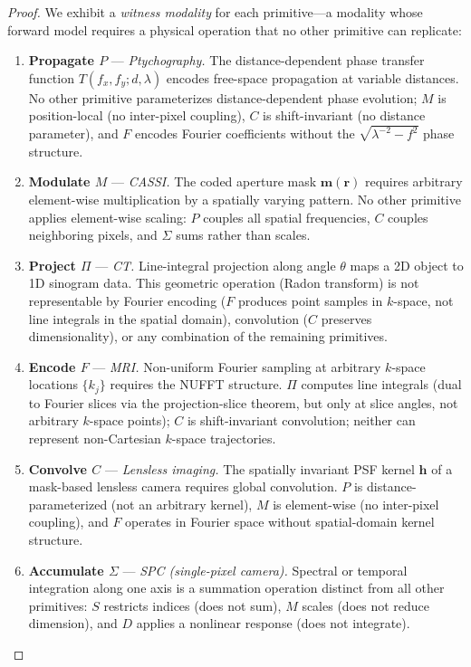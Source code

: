 \documentclass[11pt]{article}
\begin{document}
\begin{proof}
We exhibit a \emph{witness modality} for each primitive---a modality whose forward model requires a physical operation that no other primitive can replicate:
\begin{enumerate}
  \item \textbf{Propagate $P$} --- \emph{Ptychography.} The distance-dependent phase transfer function $T(f_x, f_y; d, \lambda)$ encodes free-space propagation at variable distances. No other primitive parameterizes distance-dependent phase evolution; $M$ is position-local (no inter-pixel coupling), $C$ is shift-invariant (no distance parameter), and $F$ encodes Fourier coefficients without the $\sqrt{\lambda^{-2} - f^2}$ phase structure.

  \item \textbf{Modulate $M$} --- \emph{CASSI.} The coded aperture mask $\mathbf{m}(\mathbf{r})$ requires arbitrary element-wise multiplication by a spatially varying pattern. No other primitive applies element-wise scaling: $P$ couples all spatial frequencies, $C$ couples neighboring pixels, and $\Sigma$ sums rather than scales.

  \item \textbf{Project $\Pi$} --- \emph{CT.} Line-integral projection along angle $\theta$ maps a 2D object to 1D sinogram data. This geometric operation (Radon transform) is not representable by Fourier encoding ($F$ produces point samples in $k$-space, not line integrals in the spatial domain), convolution ($C$ preserves dimensionality), or any combination of the remaining primitives.

  \item \textbf{Encode $F$} --- \emph{MRI.} Non-uniform Fourier sampling at arbitrary $k$-space locations $\{k_j\}$ requires the NUFFT structure. $\Pi$ computes line integrals (dual to Fourier slices via the projection-slice theorem, but only at slice angles, not arbitrary $k$-space points); $C$ is shift-invariant convolution; neither can represent non-Cartesian $k$-space trajectories.

  \item \textbf{Convolve $C$} --- \emph{Lensless imaging.} The spatially invariant PSF kernel $\mathbf{h}$ of a mask-based lensless camera requires global convolution. $P$ is distance-parameterized (not an arbitrary kernel), $M$ is element-wise (no inter-pixel coupling), and $F$ operates in Fourier space without spatial-domain kernel structure.

  \item \textbf{Accumulate $\Sigma$} --- \emph{SPC (single-pixel camera).} Spectral or temporal integration along one axis is a summation operation distinct from all other primitives: $S$ restricts indices (does not sum), $M$ scales (does not reduce dimension), and $D$ applies a nonlinear response (does not integrate).


\end{enumerate}
\end{proof}
\end{document}
